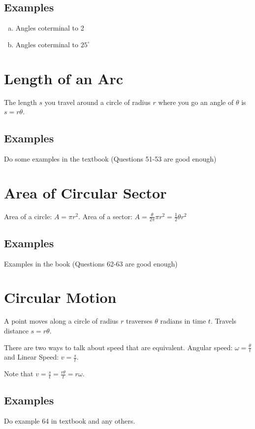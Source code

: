 \documentclass{tufte-handout}
\begin{document}
\subsection{Examples}
\begin{enumerate}[(a)]
\item Angles coterminal to 2
\item Angles coterminal to $25^{\circ}$
\end{enumerate}

\section{Length of an Arc}

The length $s$ you travel around a circle of radius $r$ where you go an angle of $\theta$ is $s = r\theta$.

\subsection{Examples}
Do some examples in the textbook (Questions 51-53 are good enough)

\section{Area of Circular Sector}
Area of a circle: $A = \pi r^2$.  Area of a sector: $A = \frac{\theta}{2\pi}\pi r^2 = \frac{1}{2}\theta r^2$

\subsection{Examples}
Examples in the book (Questions 62-63 are good enough)

\section{Circular Motion}
A point moves along a circle of radius $r$ traverses $\theta$ radians in time $t$.  Travels distance $s=r\theta$.

There are two ways to talk about speed that are equivalent.  Angular speed: $\omega= \frac{\theta}{t}$ and Linear Speed: $v=\frac{s}{t}$.

Note that $v = \frac{s}{t} = \frac{r\theta}{t} = r \omega$.

\subsection{Examples}
Do example 64 in textbook and any others. 
\end{document}
